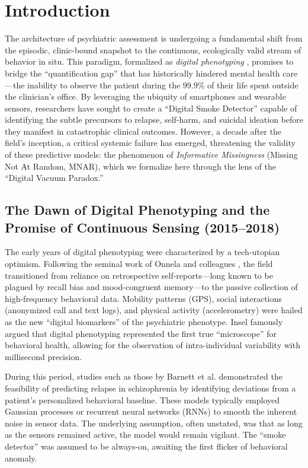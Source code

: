 \section{Introduction}

The architecture of psychiatric assessment is undergoing a fundamental shift from the episodic, clinic-bound snapshot to the continuous, ecologically valid stream of behavior in situ. This paradigm, formalized as \textit{digital phenotyping} \cite{onnela2016harnessing}, promises to bridge the ``quantification gap'' that has historically hindered mental health care—the inability to observe the patient during the $99.9\%$ of their life spent outside the clinician's office. By leveraging the ubiquity of smartphones and wearable sensors, researchers have sought to create a ``Digital Smoke Detector'' \cite{nock2026predicting} capable of identifying the subtle precursors to relapse, self-harm, and suicidal ideation before they manifest in catastrophic clinical outcomes. However, a decade after the field's inception, a critical systemic failure has emerged, threatening the validity of these predictive models: the phenomenon of \textit{Informative Missingness} (Missing Not At Random, MNAR), which we formalize here through the lens of the ``Digital Vacuum Paradox.''

\subsection{The Dawn of Digital Phenotyping and the Promise of Continuous Sensing (2015–2018)}
The early years of digital phenotyping were characterized by a tech-utopian optimism. Following the seminal work of Onnela and colleagues \cite{onnela2016harnessing}, the field transitioned from reliance on retrospective self-reports—long known to be plagued by recall bias and mood-congruent memory—to the passive collection of high-frequency behavioral data. Mobility patterns (GPS), social interactions (anonymized call and text logs), and physical activity (accelerometry) were hailed as the new ``digital biomarkers'' of the psychiatric phenotype. Insel \cite{insel2017digital} famously argued that digital phenotyping represented the first true ``microscope'' for behavioral health, allowing for the observation of intra-individual variability with millisecond precision.

During this period, studies such as those by Barnett et al. \cite{barnett2018relapse} demonstrated the feasibility of predicting relapse in schizophrenia by identifying deviations from a patient's personalized behavioral baseline. These models typically employed Gaussian processes or recurrent neural networks (RNNs) to smooth the inherent noise in sensor data. The underlying assumption, often unstated, was that as long as the sensors remained active, the model would remain vigilant. The ``smoke detector'' was assumed to be always-on, awaiting the first flicker of behavioral anomaly.

